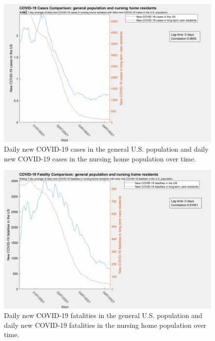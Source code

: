 \documentclass[twoside]{article}
\begin{document}
\begin{multicols}{2}
\begin{figure}[H]
	\includegraphics[width=\linewidth]{images/usa_nursing_cases-0lag.png}
	\caption{Daily new COVID-19 cases in the general U.S. population and daily new COVID-19 cases in the nursing home population over time. }
	\label{fig:images/usa_nursing_cases-0lagLabel}
\end{figure}

\begin{figure}[H]
	\includegraphics[width=\linewidth]{images/usa_nursing_fatalities-0lag.png}
	\caption{Daily new COVID-19 fatalities in the general U.S. population and daily new COVID-19 fatalities in the nursing home population over time. }
	\label{fig:images/usa_nursing_fatalities-0lagLabel}
\end{figure}


\end{multicols}
\end{document}
